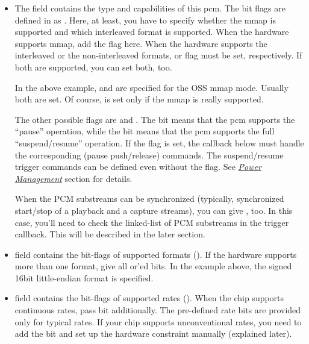 \documentclass[a4paper,8pt,english]{sphinxmanual}
\begin{document}
\begin{itemize}
\item {} 
The  field contains the type and capabilities of this
pcm. The bit flags are defined in  as
. Here, at least, you have to specify whether
the mmap is supported and which interleaved format is
supported. When the hardware supports mmap, add the
 flag here. When the hardware supports the
interleaved or the non-interleaved formats,
 or 
flag must be set, respectively. If both are supported, you can set
both, too.

In the above example,  and  are
specified for the OSS mmap mode. Usually both are set. Of course,
 is set only if the mmap is really supported.

The other possible flags are  and
. The  bit means that the pcm
supports the “pause” operation, while the  bit means that
the pcm supports the full “suspend/resume” operation. If the
 flag is set, the  callback below must handle
the corresponding (pause push/release) commands. The suspend/resume
trigger commands can be defined even without the 
flag. See {\hyperref[sound/kernel\string-api/writing\string-an\string-alsa\string-driver:power\string-management]{\emph{Power Management}}} section for details.

When the PCM substreams can be synchronized (typically,
synchronized start/stop of a playback and a capture streams), you
can give , too. In this case, you'll
need to check the linked-list of PCM substreams in the trigger
callback. This will be described in the later section.

\item {} 
 field contains the bit-flags of supported formats
(). If the hardware supports more than one
format, give all or'ed bits. In the example above, the signed 16bit
little-endian format is specified.

\item {} 
 field contains the bit-flags of supported rates
(). When the chip supports continuous rates,
pass  bit additionally. The pre-defined rate bits are
provided only for typical rates. If your chip supports
unconventional rates, you need to add the  bit and set up
the hardware constraint manually (explained later).


\end{itemize}
\end{document}
